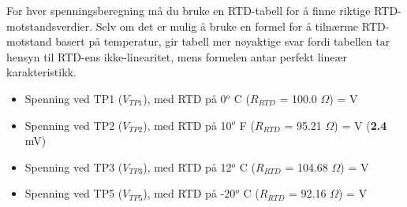 \vskip 10pt

For hver spenningsberegning må du bruke en RTD-tabell for å finne riktige RTD-motstandsverdier. Selv om det er mulig å bruke en formel for å tilnærme RTD-motstand basert på temperatur, gir tabell mer nøyaktige svar fordi tabellen tar hensyn til RTD-ens ikke-linearitet, mens formelen antar perfekt lineær karakteristikk.

\vskip 10pt

\begin{itemize}
\item{} Spenning ved TP1 ($V_{TP1}$), med RTD på 0$^{o}$ C ($R_{RTD}$ = 100.0 $\Omega$) =  V
\vskip 5pt
\item{} Spenning ved TP2 ($V_{TP2}$), med RTD på 10$^{o}$ F ($R_{RTD}$ = 95.21 $\Omega$) =  V ({\bf 2.4} mV)
\vskip 5pt
\item{} Spenning ved TP3 ($V_{TP3}$), med RTD på 12$^{o}$ C ($R_{RTD}$ = 104.68 $\Omega$) =  V
\vskip 5pt
\item{} Spenning ved TP5 ($V_{TP5}$), med RTD på -20$^{o}$ C ($R_{RTD}$ = 92.16 $\Omega$) =  V
\end{itemize}









